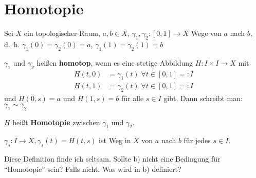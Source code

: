 \documentclass[a5paper,oneside]{scrbook}
\begin{document}
\section{Homotopie}
\begin{definition}%
    Sei $X$ ein topologischer Raum, $a, b \in X$, 
    $\gamma_1, \gamma_2: [0,1] \rightarrow X$ Wege von $a$ nach $b$,
    d.~h. $\gamma_1(0) = \gamma_2(0) = a$, $\gamma_1(1) = \gamma_2(1) = b$

    \begin{defenum}
        \item $\gamma_1$ und $\gamma_2$ heißen \textbf{homotop},
              wenn es eine stetige Abbildung $H : I \times I \rightarrow X$ mit
              \begin{align*}
                H(t,0) &= \gamma_1(t)\;\forall t \in [0,1] =: I\\
                H(t,1) &= \gamma_2(t)\;\forall t \in [0,1] =: I
              \end{align*}
              und $H(0,s) = a$ und $H(1,s) = b$ für alle $s \in I$ gibt.
              Dann schreibt man: $\gamma_1 \sim \gamma_2$

              $H$ heißt \textbf{Homotopie} zwischen
              $\gamma_1$ und $\gamma_2$.
        \item $\gamma_s: I \rightarrow X, \gamma_s(t) = H(t,s)$ ist
              Weg in $X$ von $a$ nach $b$ für jedes $s \in I$.
    \end{defenum}
\end{definition}

Diese Definition finde ich seltsam. Sollte b) nicht eine Bedingung für \enquote{Homotopie}
sein? Falls nicht: Was wird in b) definiert?
\end{document}
